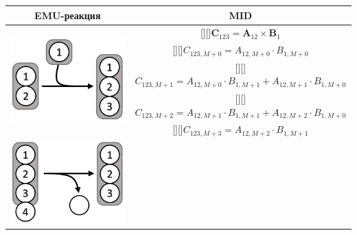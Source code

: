 \documentclass[14pt, a4paper]{extreport}
\newcommand{\adj}[1]{\raisebox{-2pt}[\height][\depth]{#1}}
\begin{document}
\begin{table}[!h]
	\begin{center}
		\begin{tabular}{c | c}
			\hline
			EMU-реакция & MID\\
			\hline
			\multirow{5}{*}[-1mm]{
				\begin{minipage}{0.3\linewidth}
					\centering{Реакция конденсации}
					\includegraphics[scale=0.85]{EMU_reaction_1.png}
				\end{minipage}
			} 
			& \adj{$\mathbf{C}_{123} = \mathbf{A}_{12} \times \mathbf{B}_1$}\\[0.5ex]
			& \adj{$C_{123,M+0} = A_{12,M+0} \cdot B_{1,M+0}$}\\ [0.5ex]
			& \adj{$C_{123,M+1} = A_{12,M+0} \cdot B_{1,M+1} + A_{12,M+1} \cdot B_{1,M+0}$}\\ [0.5ex]
			& \adj{$C_{123,M+2} = A_{12,M+1} \cdot B_{1,M+1} + A_{12,M+2} \cdot B_{1,M+0}$}\\ [0.5ex]
			& \adj{$C_{123,M+3} = A_{12,M+2} \cdot B_{1,M+1}$} \\ [0.5ex]
			\hline 
			\multirow{5}{*}[-1mm]{
				\begin{minipage}{0.3\linewidth}
					\centering{Реакция расщепления}
					\includegraphics[scale=0.85]{EMU_reaction_2.png}

\end{minipage}}
\end{tabular}
\end{center}
\end{table}
\end{document}
